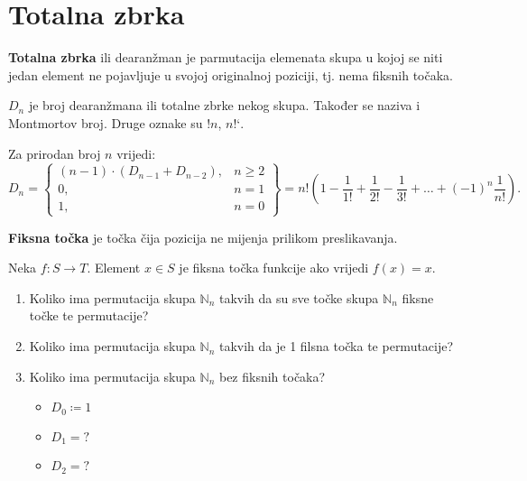 \section{Totalna zbrka}

\textbf{Totalna zbrka} ili dearanžman je parmutacija elemenata skupa u kojoj se
niti jedan element ne pojavljuje u svojoj originalnoj poziciji, tj. nema fiksnih
točaka.

\bigskip
\noindent
$D_n$ je broj dearanžmana ili totalne zbrke nekog skupa. Također se naziva i Montmortov broj. Druge oznake su $!n$, $n\text{!`}$.

\begin{theorem}
    Za prirodan broj $n$ vrijedi:
    $$
        D_n = \begin{Bmatrix}
            (n-1) \cdot (D_{n - 1} + D_{n - 2}),&n \geq 2\\
            0,&n = 1\\
            1,&n = 0
        \end{Bmatrix} = n! \left(1-\frac{1}{1!} + \frac{1}{2!} - \frac{1}{3!} + \dots + (-1)^n \frac{1}{n!}\right).
    $$
\end{theorem}

\textbf{Fiksna točka} je točka čija pozicija ne mijenja prilikom preslikavanja.

\begin{example}
    Neka $f:S\to T$. Element $x\in S$ je fiksna točka funkcije ako vrijedi $f(x)
    = x$.

    \begin{enumerate}
        \item Koliko ima permutacija skupa $\mathbb{N}_n$ takvih da su sve točke
        skupa $\mathbb{N}_n$ fiksne točke te permutacije?
        \item Koliko ima permutacija skupa $\mathbb{N}_n$ takvih da je 1 filsna
        točka te permutacije?
        \item Koliko ima permutacija skupa $\mathbb{N}_n$ bez fiksnih točaka?
        \begin{itemize}
            \item $D_0 \coloneq 1$
            \item $D_1 = ?$
            \item $D_2 = ?$
        \end{itemize}
    \end{enumerate}
\end{example}

